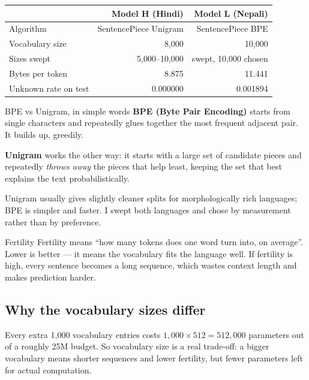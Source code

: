 \documentclass[11pt]{report}
\begin{document}
\begin{center}
\begin{tabular}{@{}lrr@{}}
\toprule
 & \textbf{Model H (Hindi)} & \textbf{Model L (Nepali)} \\
\midrule
Algorithm & SentencePiece Unigram & SentencePiece BPE \\
Vocabulary size & 8,000 & 10,000 \\
Sizes swept & 5,000--10,000 & swept, 10,000 chosen \\
Bytes per token & 8.875 & 11.441 \\
Unknown rate on test & 0.000000 & 0.001894 \\
\bottomrule
\end{tabular}
\end{center}

\begin{concept}{BPE vs Unigram, in simple words}
\textbf{BPE (Byte Pair Encoding)} starts from single characters and repeatedly
glues together the most frequent adjacent pair. It builds up, greedily.

\textbf{Unigram} works the other way: it starts with a large set of candidate
pieces and repeatedly \emph{throws away} the pieces that help least, keeping the
set that best explains the text probabilistically.

Unigram usually gives slightly cleaner splits for morphologically rich
languages; BPE is simpler and faster. I swept both languages and chose by
measurement rather than by preference.
\end{concept}

\begin{concept}{Fertility}
Fertility means ``how many tokens does one word turn into, on average''. Lower
is better --- it means the vocabulary fits the language well. If fertility is
high, every sentence becomes a long sequence, which wastes context length and
makes prediction harder.
\end{concept}

\subsection{Why the vocabulary sizes differ}

Every extra 1{,}000 vocabulary entries costs $1{,}000 \times 512 = 512{,}000$
parameters out of a roughly 25M budget. So vocabulary size is a real trade-off:
a bigger vocabulary means shorter sequences and lower fertility, but fewer
parameters left for actual computation.
\end{document}
